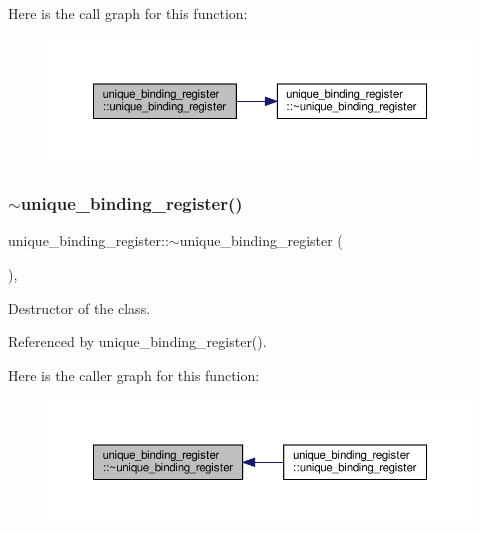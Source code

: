Here is the call graph for this function\+:
\nopagebreak
\begin{figure}[H]
\begin{center}
\leavevmode
\includegraphics[width=350pt]{d7/dfe/classunique__binding__register_a2b450419dc8f29e7d75d5898d783d6d5_cgraph}
\end{center}
\end{figure}
\mbox{\label{classunique__binding__register_aaa735fd321ea2aa74c198d469b8ad2e0}} 
\subsubsection{\texorpdfstring{$\sim$unique\+\_\+binding\+\_\+register()}{~unique\_binding\_register()}}
{\footnotesize\ttfamily unique\+\_\+binding\+\_\+register\+::$\sim$unique\+\_\+binding\+\_\+register (\begin{DoxyParamCaption}{ }\end{DoxyParamCaption})\hspace{0.3cm}{\ttfamily [override]}, {\ttfamily [default]}}



Destructor of the class. 



Referenced by unique\+\_\+binding\+\_\+register().

Here is the caller graph for this function\+:
\nopagebreak
\begin{figure}[H]
\begin{center}
\leavevmode
\includegraphics[width=350pt]{d7/dfe/classunique__binding__register_aaa735fd321ea2aa74c198d469b8ad2e0_icgraph}
\end{center}
\end{figure}


